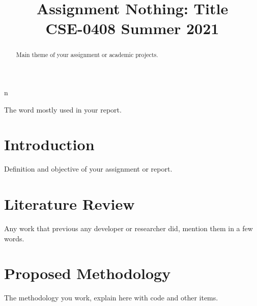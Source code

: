 \documentclass[conference]{IEEEtran}
\begin{document}
\title{Assignment Nothing: Title\\
{\footnotesize \textsuperscript{}CSE-0408 Summer 2021 }
}

\author{
}

\maketitle

\begin{abstract}

Main theme of your assignment or academic projects.


\end{abstract}n


\begin{IEEEkeywords}
The word mostly used in your report.
\end{IEEEkeywords}

\section{Introduction}
Definition and objective of your assignment or report.

\section{Literature Review}

Any work that previous any developer or researcher did, mention them in a few words.

\section{Proposed Methodology}

The methodology you work, explain here with code and other items.
\end{document}
